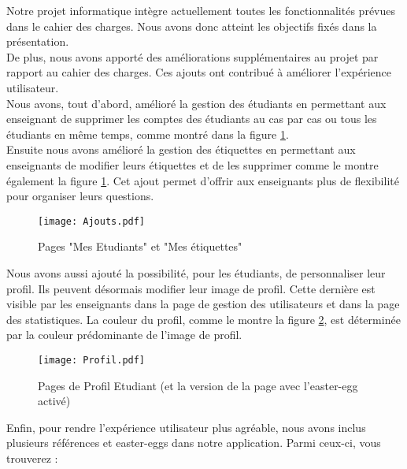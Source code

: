 Notre projet informatique intègre actuellement toutes les fonctionnalités prévues dans le cahier des charges. Nous avons donc atteint les objectifs fixés dans la présentation.\\

De plus, nous avons apporté des améliorations supplémentaires au projet par rapport au cahier des charges. Ces ajouts ont contribué à améliorer l'expérience utilisateur.\\

Nous avons, tout d'abord, amélioré la gestion des étudiants en permettant aux enseignant de supprimer les comptes des étudiants au cas par cas ou tous les étudiants en même temps, comme montré dans la figure \ref{fig:ajouts}.\\

Ensuite nous avons amélioré la gestion des étiquettes en permettant aux enseignants de modifier leurs étiquettes et de les supprimer comme le montre également la figure \ref{fig:ajouts}. Cet ajout permet d'offrir aux enseignants plus de flexibilité pour organiser leurs questions.\\

\vspace{2mm}
\begin{figure}[H]
\texttt{[image: Ajouts.pdf]}
\caption{Pages "Mes Etudiants" et "Mes étiquettes"}
\label{fig:ajouts}
\centering
\end{figure}
\vspace{3mm}

Nous avons aussi ajouté la possibilité, pour les étudiants, de personnaliser leur profil. Ils peuvent désormais modifier leur image de profil. Cette dernière est visible par les enseignants dans la page de gestion des utilisateurs et dans la page des statistiques. La couleur du profil, comme le montre la figure \ref{fig:profil}, est déterminée par la couleur prédominante de l'image de profil.\\

\vspace{2mm}
\begin{figure}[H]
\texttt{[image: Profil.pdf]}
\caption{Pages de Profil Etudiant (et la version de la page avec l'easter-egg activé)}
\label{fig:profil}
\centering
\end{figure}
\newpage

Enfin, pour rendre l'expérience utilisateur plus agréable, nous avons inclus plusieurs références et easter-eggs dans notre application. Parmi ceux-ci, vous trouverez :\\

